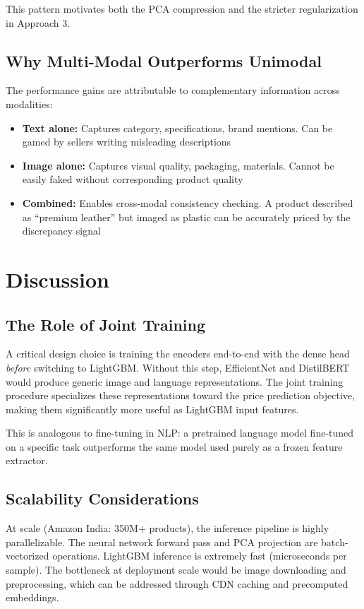 \documentclass[conference]{IEEEtran}
\begin{document}
This pattern motivates both the PCA compression and the stricter regularization in Approach 3.

\subsection{Why Multi-Modal Outperforms Unimodal}

The performance gains are attributable to complementary information across modalities:
\begin{itemize}
    \item \textbf{Text alone:} Captures category, specifications, brand mentions. Can be gamed by sellers writing misleading descriptions
    \item \textbf{Image alone:} Captures visual quality, packaging, materials. Cannot be easily faked without corresponding product quality
    \item \textbf{Combined:} Enables cross-modal consistency checking. A product described as ``premium leather'' but imaged as plastic can be accurately priced by the discrepancy signal
\end{itemize}

\section{Discussion}

\subsection{The Role of Joint Training}
A critical design choice is training the encoders end-to-end with the dense head \textit{before} switching to LightGBM. Without this step, EfficientNet and DistilBERT would produce generic image and language representations. The joint training procedure specializes these representations toward the price prediction objective, making them significantly more useful as LightGBM input features.

This is analogous to fine-tuning in NLP: a pretrained language model fine-tuned on a specific task outperforms the same model used purely as a frozen feature extractor.

\subsection{Scalability Considerations}
At scale (Amazon India: 350M+ products), the inference pipeline is highly parallelizable. The neural network forward pass and PCA projection are batch-vectorized operations. LightGBM inference is extremely fast (microseconds per sample). The bottleneck at deployment scale would be image downloading and preprocessing, which can be addressed through CDN caching and precomputed embeddings.
\end{document}
